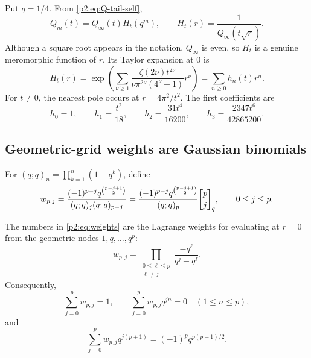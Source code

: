 \documentclass[11pt,oneside]{article}
\numberwithin{equation}{section}
\theoremstyle{definition}
\theoremstyle{remark}
\begin{document}
Put $q=1/4$.  From \eqref{p2:eq:Q-tail-self},
\begin{equation}
 Q_m(t)=Q_\infty(t)H_t(q^m),
 \qquad
 H_t(r)=\frac{1}{Q_\infty(t\sqrt r)}.
 \label{p2:eq:Hdef}
\end{equation}
Although a square root appears in the notation, $Q_\infty$ is even, so $H_t$ is a genuine
meromorphic function of $r$.  Its Taylor expansion at $0$ is
\begin{equation}
 H_t(r)=\exp\!\left(\sum_{\nu\ge1}
 \frac{\zeta(2\nu)t^{2\nu}}{\nu\pi^{2\nu}(4^\nu-1)}r^\nu\right)
 =\sum_{n\ge0}h_n(t)r^n.
 \label{p2:eq:Hseries}
\end{equation}
For $t\ne0$, the nearest pole occurs at $r=4\pi^2/t^2$.  The first coefficients are
\begin{equation}
 h_0=1,\qquad h_1=\frac{t^2}{18},\qquad
 h_2=\frac{31t^4}{16200},\qquad
 h_3=\frac{2347t^6}{42865200}.
 \label{p2:eq:hfirst}
\end{equation}

\subsection{Geometric-grid weights are Gaussian binomials}

For $(q;q)_n=\prod_{k=1}^{n}(1-q^k)$, define
\begin{equation}
 w_{p,j}=
 \frac{(-1)^{p-j}q^{\binom{p-j+1}{2}}}
 {(q;q)_j(q;q)_{p-j}}
 =\frac{(-1)^{p-j}q^{\binom{p-j+1}{2}}}{(q;q)_p}
   \qbinom{p}{j}{q},
 \qquad 0\le j\le p.
 \label{p2:eq:weights}
\end{equation}

\begin{lemma}
\label{p2:lem:weights}
The numbers in \eqref{p2:eq:weights} are the Lagrange weights for evaluating at $r=0$ from the
geometric nodes $1,q,\ldots,q^p$:
\begin{equation}
 w_{p,j}=\prod_{\substack{0\le\ell\le p\\\ell\ne j}}
 \frac{-q^\ell}{q^j-q^\ell}.
 \label{p2:eq:weights-Lagrange}
\end{equation}
Consequently,
\begin{equation}
 \sum_{j=0}^{p}w_{p,j}=1,
 \qquad
 \sum_{j=0}^{p}w_{p,j}q^{jn}=0\quad(1\le n\le p),
 \label{p2:eq:moment-cancel}
\end{equation}
and
\begin{equation}
 \sum_{j=0}^{p}w_{p,j}q^{j(p+1)}
 =(-1)^pq^{p(p+1)/2}.
 \label{p2:eq:first-uncancelled}
\end{equation}
\end{lemma}
\end{document}
